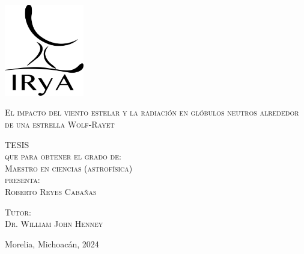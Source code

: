 \documentclass[letterpaper,12pt,oneside]{book}
\begin{document}
\begin{titlepage}
        \begin{minipage}[c][0.81\textheight][t]{0.25\textwidth}
            \vspace*{5mm}
            \begin{center}
                \hskip2.0mm
                \vrule width1pt height13cm 
                \vspace{5mm}
                \hskip2pt
                \vrule width2.5pt height13cm
                \hskip2mm
                \vrule width1pt height13cm \\
                \vspace{5mm}
                \includegraphics[height=4.0cm]{logoIRyAnegro_1.png}
            \end{center}
        \end{minipage}
        \begin{minipage}[c][0.81\textheight][t]{0.75\textwidth}
            \begin{center}
                \vspace{1cm}

                {\large\scshape El impacto del viento estelar y la radiación en glóbulos neutros alrededor de una estrella Wolf-Rayet}\\[.2in]

                \vspace{2cm}            

                \textsc{\LARGE T\hspace{1.5cm}E\hspace{1.5cm}S\hspace{1.5cm}I\hspace{1.5cm}S}\\[0.5cm]
                \textsc{\large que para obtener el grado de:}\\[0.5cm]
                \textsc{\large Maestro en ciencias (astrofísica)}\\[0.5cm]
                \textsc{\large presenta:}\\[0.5cm]
                \textsc{\large {Roberto Reyes Cabañas}}\\[2cm]          

                \vspace{0.5cm}

                {\large\scshape Tutor:\\[0.3cm] {Dr. William John Henney }}\\ [.2in]

                \vspace{0.5cm}

                \large{Morelia, Michoacán,}{ }{2024}
            \end{center}
        \end{minipage}
    \end{titlepage}



\end{document}
